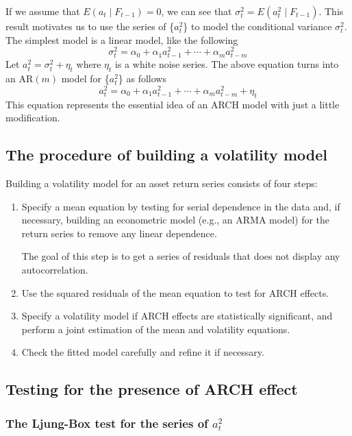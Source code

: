 \documentclass[a4paper,11pt]{article}
\begin{document}
If we assume that \(E(a_t \mid F_{t-1}) = 0\), we can see that
\(\sigma^2_t = E(a^2_t \mid F_{t-1})\). This result motivates us to use
the series of \{\(a^2_t\)\} to model the conditional variance
\(\sigma^2_t\). The simplest model is a linear model, like the following
\[ \sigma^2_t = \alpha_0 + \alpha_1 a^2_{t-1} + \cdots + \alpha_m a^2_{t-m} \]
Let \(a^2_t = \sigma^2_t + \eta_t\) where \(\eta_t\) is a white noise
series. The above equation turns into an AR\((m)\) model for \{\(a^2_t\)\}
as follows
\[a^2_t = \alpha_0 + \alpha_1 a^2_{t-1} + \cdots + \alpha_m
a^2_{t-m} + \eta_t \]
This equation represents the essential idea of an ARCH model with just
a little modification. 


\subsection{The procedure of building a volatility model}
\label{sec:org41338cd}

Building a volatility model for an asset return series consists of
four steps:

\begin{enumerate}
\item Specify a mean equation by testing for serial dependence in the
data and, if necessary, building an econometric model (e.g., an
ARMA model) for the return series to remove any linear dependence.

The goal of this step is to get a series of residuals that does not
display any autocorrelation.

\item Use the squared residuals of the mean equation to test for ARCH
effects.

\item Specify a volatility model if ARCH effects are statistically
significant, and perform a joint estimation of the mean and
volatility equations.

\item Check the fitted model carefully and refine it if necessary.
\end{enumerate}


\subsection{Testing for the presence of ARCH effect}
\label{sec:org3a7262f}

\subsubsection*{The Ljung-Box test for the series of \(a^2_t\)}
\label{sec:org9182c73}
\end{document}
